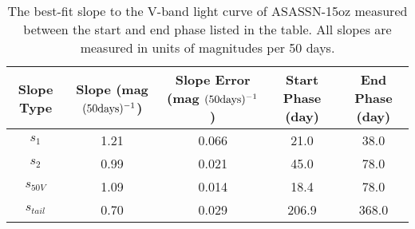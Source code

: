 \begin{table*}
\centering
\caption{The best-fit slope to the V-band light curve of ASASSN-15oz measured between the start and end phase listed in the table. All slopes are measured in units of magnitudes per 50 days.\label{tab:slope}}
\begin{tabular}{ccccc}
\hline
Slope Type & Slope (mag $\rm{(50 days)^{-1}}$) & Slope Error (mag $\rm{(50 days)^{-1}}$) & Start Phase (day) & End Phase (day) \\
\hline
$s_1$ & 1.21 & 0.066 & 21.0 & 38.0 \\
$s_2$ & 0.99 & 0.021 & 45.0 & 78.0 \\
$s_{50V}$ & 1.09 & 0.014 & 18.4 & 78.0 \\
$s_{tail}$ & 0.70 & 0.029 & 206.9 & 368.0 \\
\hline
\end{tabular}
\end{table*}
